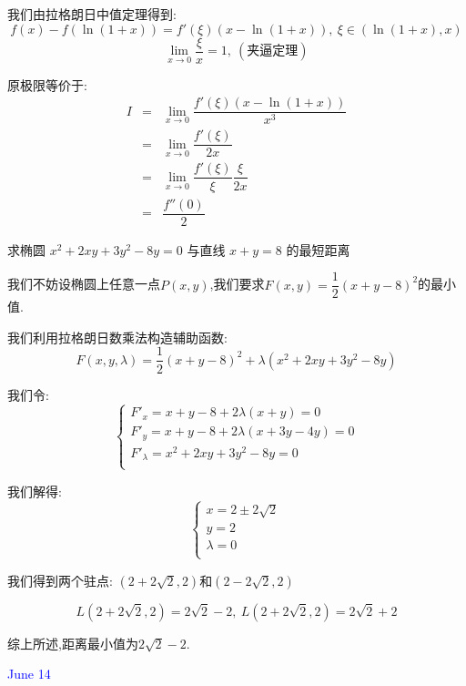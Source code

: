 \begin{solution}
	
	我们由拉格朗日中值定理得到: 
	$$f(x)-f(\ln(1+x))=f'(\xi)(x-\ln(1+x)),\ \xi\in(\ln(1+x),x)$$
	$$\lim\limits_{x\to 0}\dfrac{\xi}{x}=1,\ (\text{夹逼定理})$$
	
	原极限等价于: 
	\begin{eqnarray*}
		I&=&\lim\limits_{x\to 0}\dfrac{f'(\xi)(x-\ln(1+x))}{x^3}\\
		&=&\lim\limits_{x\to 0}\dfrac{f'(\xi)}{2x}\\
		&=&\lim\limits_{x\to 0}\dfrac{f'(\xi)}{\xi}\dfrac{\xi}{2x}\\
		&=&\dfrac{f''(0)}{2}
	\end{eqnarray*}
\end{solution}

\begin{example}[][Exam: 32.2.12]
	求椭圆 $x^2+2xy+3y^2-8y=0$ 与直线 $x+y=8$ 的最短距离
\end{example}

\begin{solution}
	
	我们不妨设椭圆上任意一点$P(x,y)$,我们要求$F(x,y)=\dfrac{1}{2}(x+y-8)^2$的最小值.
	
	我们利用拉格朗日数乘法构造辅助函数: 
	$$F(x,y,\lambda)=\dfrac{1}{2}(x+y-8)^2+\lambda(x^2+2xy+3y^2-8y)$$
	
	我们令: $$\left\lbrace 
	\begin{array}{l}
		F'_{x}=x+y-8+2\lambda (x+y)=0\\
		F'_{y}=x+y-8+2\lambda(x+3y-4y)=0\\
		F'_{\lambda}=x^2+2xy+3y^2-8y=0\\
	\end{array}
	\right. $$
	
	我们解得: $$\left\lbrace 
	\begin{array}{l}
		x=2\pm 2\sqrt{2}\\
		y=2\\
		\lambda=0\\
	\end{array}
	\right. $$
	
	我们得到两个驻点: $(2+2\sqrt{2},2)$和$(2-2\sqrt{2},2)$
	
	$$L(2+2\sqrt{2},2)=2\sqrt{2}-2,\ L(2+2\sqrt{2},2)=2\sqrt{2}+2$$
	
	综上所述,距离最小值为$2\sqrt{2}-2$.
\end{solution}


\textcolor{blue}{June 14}

